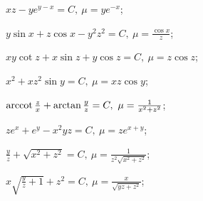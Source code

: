 \begin{enumsols}
		\label{sol:nonlinsys_pfaff:int_factor_hard}
		\item \( xz - y e^{y-x} = C, ~ \mu = y e^{-x} \); \sfill %
		\item \( y \sin{x} + z \cos{x} - y^2 z^2 = C, ~ \mu = \frac{\cos{x}}{z} \); \sfill %
		\item \( xy \cot{z} + x \sin{z} + y \cos{z} = C, ~ \mu = z \cos{z} \); \sfill %
		\item \( x^2 + xz^2 \sin{y} = C, ~ \mu = xz \cos{y} \); \sfill %
		\item \( \operatorname{arccot}{\frac{z}{x}} + \arctan{\frac{y}{z}} = C, ~ \mu = \frac{1}{x^2 + z^2} \); \sfill %
		\item \( z e^x + e^y - x^2 yz = C, ~ \mu = z e^{x + y} \); \sfill %
		\item \( \frac{y}{z} + \sqrt{x^2 + z^2} = C, ~ \mu = \frac{1}{z^2 \sqrt{x^2 + z^2}} \); \sfill %
		\item \( x \sqrt{\frac{y}{z} + 1} + z^2 = C, ~ \mu = \frac{x}{\sqrt{yz + z^2}} \); \sfill %

	\end{enumsols}

